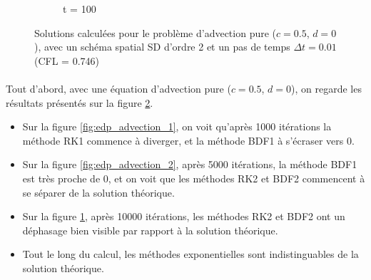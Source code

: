 \begin{figure}[H]
\begin{subfigure}{.5\textwidth}
                \caption{t = 100}
                \label{fig:edp_advection_3}
            \end{subfigure}
            \caption{Solutions calculées pour le problème d'advection pure ($c = 0.5$, $d = 0$), avec un schéma spatial SD d'ordre 2 et un pas de temps $\Delta t = 0.01$ (CFL = 0.746)}
            \label{fig:edp_advection}
        \end{figure}

        \paragraph{}
        Tout d'abord, avec une équation d'advection pure ($c = 0.5$, $d = 0$), on regarde les résultats présentés sur la figure \ref{fig:edp_advection}.
        \begin{itemize}
            \item Sur la figure \ref{fig:edp_advection_1}, on voit qu'après 1000 itérations la méthode RK1 commence à diverger, et la méthode BDF1 à s'écraser vers 0.
            \item Sur la figure \ref{fig:edp_advection_2}, après 5000 itérations, la méthode BDF1 est très proche de 0, et on voit que les méthodes RK2 et BDF2 commencent à se séparer de la solution théorique.
            \item Sur la figure \ref{fig:edp_advection_3}, après 10000 itérations, les méthodes RK2 et BDF2 ont un déphasage bien visible par rapport à la solution théorique.
            \item Tout le long du calcul, les méthodes exponentielles sont indistinguables de la solution théorique.
        \end{itemize}
